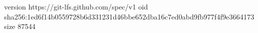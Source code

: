 version https://git-lfs.github.com/spec/v1
oid sha256:1ed6f14b0559728b6d331231d46bbe652dba16c7ed0abd9fb977f4f9e3664173
size 87544
